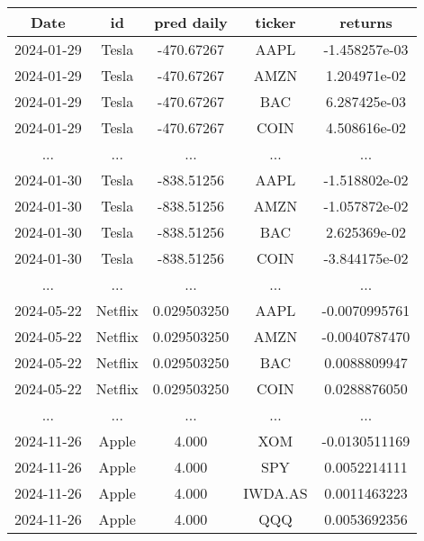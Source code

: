 \documentclass[12pt]{report}
\begin{document}
\begin{itemize}
    \begin{center}
    \small 
    \renewcommand{\arraystretch}{0.8}
    \label{tab:merged_data}
    \begin{tabular}{|c|c|c|c|c|}
    \hline
    \textbf{Date} & \textbf{id} & \textbf{pred daily} & \textbf{ticker} & \textbf{returns} \\
    \hline
    2024-01-29 & Tesla & -470.67267 & AAPL & -1.458257e-03 \\
    2024-01-29 & Tesla & -470.67267 & AMZN & 1.204971e-02 \\
    2024-01-29 & Tesla & -470.67267 & BAC & 6.287425e-03 \\
    2024-01-29 & Tesla & -470.67267 & COIN & 4.508616e-02 \\
    ... & ... & ... & ... & ... \\
    2024-01-30 & Tesla & -838.51256 & AAPL & -1.518802e-02 \\
    2024-01-30 & Tesla & -838.51256 & AMZN & -1.057872e-02 \\
    2024-01-30 & Tesla & -838.51256 & BAC & 2.625369e-02 \\
    2024-01-30 & Tesla & -838.51256 & COIN & -3.844175e-02 \\
    ... & ... & ... & ... & ... \\
    2024-05-22 & Netflix & 0.029503250 & AAPL & -0.0070995761 \\
    2024-05-22 & Netflix & 0.029503250 & AMZN & -0.0040787470 \\
    2024-05-22 & Netflix & 0.029503250 & BAC & 0.0088809947 \\
    2024-05-22 & Netflix & 0.029503250 & COIN & 0.0288876050 \\
    ... & ... & ... & ... & ... \\
    2024-11-26 & Apple & 4.000 & XOM  & -0.0130511169 \\
    2024-11-26 & Apple & 4.000 & SPY  & 0.0052214111 \\
    2024-11-26 & Apple & 4.000 & IWDA.AS & 0.0011463223 \\
    2024-11-26 & Apple & 4.000 & QQQ  & 0.0053692356 \\
    \hline
    \end{tabular}
    \end{center}
        
\end{itemize}
\\
\end{document}

